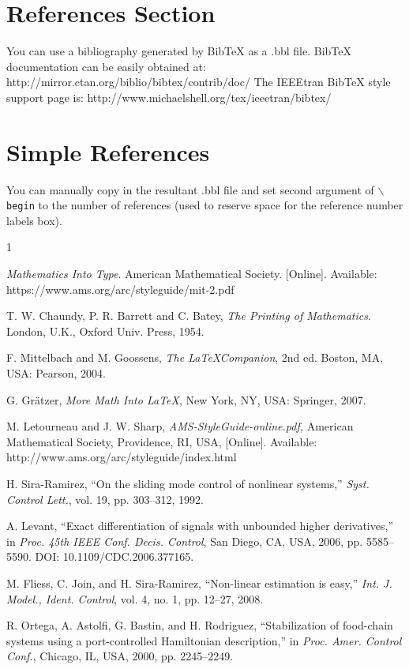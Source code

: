 \documentclass[lettersize,journal]{IEEEtran}
\begin{document}
\section{References Section}
You can use a bibliography generated by BibTeX as a .bbl file.
 BibTeX documentation can be easily obtained at:
 http://mirror.ctan.org/biblio/bibtex/contrib/doc/
 The IEEEtran BibTeX style support page is:
 http://www.michaelshell.org/tex/ieeetran/bibtex/
 
%
%
\section{Simple References}
You can manually copy in the resultant .bbl file and set second argument of $\backslash${\tt{begin}} to the number of references
 (used to reserve space for the reference number labels box).

\begin{thebibliography}{1}


{\it{Mathematics Into Type}}. American Mathematical Society. [Online]. Available: https://www.ams.org/arc/styleguide/mit-2.pdf

T. W. Chaundy, P. R. Barrett and C. Batey, {\it{The Printing of Mathematics}}. London, U.K., Oxford Univ. Press, 1954.

F. Mittelbach and M. Goossens, {\it{The \LaTeX Companion}}, 2nd ed. Boston, MA, USA: Pearson, 2004.

G. Gr\"atzer, {\it{More Math Into LaTeX}}, New York, NY, USA: Springer, 2007.

M. Letourneau and J. W. Sharp, {\it{AMS-StyleGuide-online.pdf,}} American Mathematical Society, Providence, RI, USA, [Online]. Available: http://www.ams.org/arc/styleguide/index.html

H. Sira-Ramirez, ``On the sliding mode control of nonlinear systems,'' \textit{Syst. Control Lett.}, vol. 19, pp. 303--312, 1992.

A. Levant, ``Exact differentiation of signals with unbounded higher derivatives,''  in \textit{Proc. 45th IEEE Conf. Decis.
Control}, San Diego, CA, USA, 2006, pp. 5585--5590. DOI: 10.1109/CDC.2006.377165.

M. Fliess, C. Join, and H. Sira-Ramirez, ``Non-linear estimation is easy,'' \textit{Int. J. Model., Ident. Control}, vol. 4, no. 1, pp. 12--27, 2008.

R. Ortega, A. Astolfi, G. Bastin, and H. Rodriguez, ``Stabilization of food-chain systems using a port-controlled Hamiltonian description,'' in \textit{Proc. Amer. Control Conf.}, Chicago, IL, USA,
2000, pp. 2245--2249.

\end{thebibliography}
\end{document}
